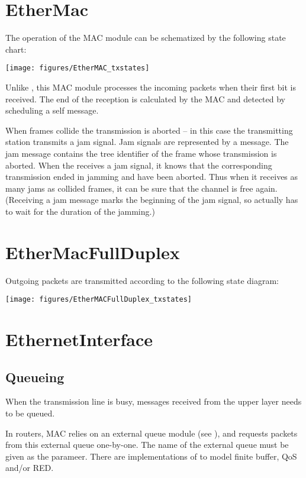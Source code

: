 \section{EtherMac}

The operation of the MAC module can be schematized by the following state chart:

\begin{center}
\texttt{[image: figures/EtherMAC\_txstates]}
\end{center}

Unlike , this MAC module processes the incoming packets when their
first bit is received. The end of the reception is calculated by the MAC and
detected by scheduling a self message.

When frames collide the transmission is aborted -- in this case the transmitting
station transmits a jam signal. Jam signals are represented
by a  message. The jam message contains the tree identifier
of the frame whose transmission is aborted. When the  receives a jam
signal, it knows that the corresponding transmission ended in jamming and have
been aborted. Thus when it receives as many jams as collided frames, it can
be sure that the channel is free again. (Receiving a jam message marks the
beginning of the jam signal, so actually has to wait for the duration of the jamming.)

\section{EtherMacFullDuplex}

Outgoing packets are transmitted according to the following state diagram:

\begin{center}
\texttt{[image: figures/EtherMACFullDuplex\_txstates]}
\end{center}

\section{EthernetInterface}

\subsection*{Queueing}

When the transmission line is busy, messages received from the upper layer
needs to be queued.

In routers, MAC relies on an external queue module (see ),
and requests packets from this external queue one-by-one. The name of the
external queue must be given as the  parameer.
There are implementations of  to model finite buffer,
QoS and/or RED.

